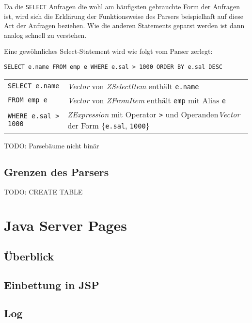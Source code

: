 Da die \verb|SELECT| Anfragen die wohl am häufigsten gebrauchte Form der Anfragen ist, wird sich die Erklärung der Funktionsweise des Parsers beispielhaft auf diese Art der Anfragen beziehen. Wie die anderen Statements geparst werden ist dann analog schnell zu verstehen.

Eine gewöhnliches Select-Statement wird wie folgt vom Parser zerlegt:
\begin{verbatim}SELECT e.name FROM emp e WHERE e.sal > 1000 ORDER BY e.sal DESC\end{verbatim}

\begin{tabular}{ll}
\verb|SELECT e.name| & \textit{Vector} von \textit{ZSelectItem} enthält \verb|e.name| \\ 
\verb|FROM emp e| & \textit{Vector} von \textit{ZFromItem} enthält \verb|emp| mit Alias \verb|e| \\
\verb|WHERE e.sal > 1000| & \textit{ZExpression} mit Operator \verb|>| und Operanden\textit{Vector} der Form \{\verb|e.sal|, \verb|1000|\} \\
\end{tabular}

TODO: Parsebäume nicht binär

\subsection{Grenzen des Parsers}

TODO: CREATE TABLE

\section{Java Server Pages}

\subsection{Überblick}

\subsection{Einbettung in JSP}

\subsection{Log}